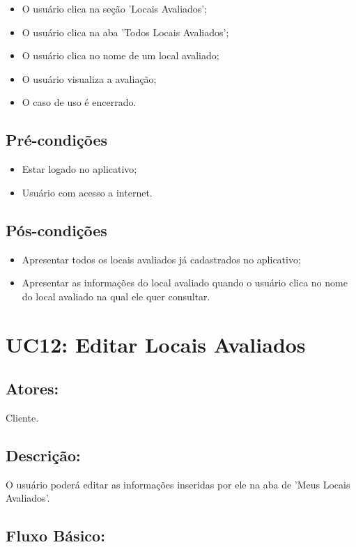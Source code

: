 \begin{itemize}
    \item O usuário clica na seção 'Locais Avaliados';
    \item O usuário clica na aba 'Todos Locais Avaliados';  
    \item O usuário clica no nome de um local avaliado;
    \item O usuário visualiza a avaliação;
    \item O caso de uso é encerrado. 
\end{itemize}

\subsection{Pré-condições}
\begin{itemize}
    \item Estar logado no aplicativo;
    \item Usuário com acesso a internet. 
\end{itemize}
\subsection{Pós-condições}
\begin{itemize}
    \item Apresentar todos os locais avaliados já cadastrados no aplicativo;
    \item Apresentar as informações do local avaliado quando o usuário clica no nome do local avaliado na qual ele quer consultar. 
\end{itemize}

\section{UC12: Editar Locais Avaliados}

\subsection{Atores:}
Cliente. 
\subsection{Descrição:}
O usuário poderá editar as informações inseridas por ele na aba de 'Meus Locais Avaliados'.
\subsection{Fluxo Básico:}

